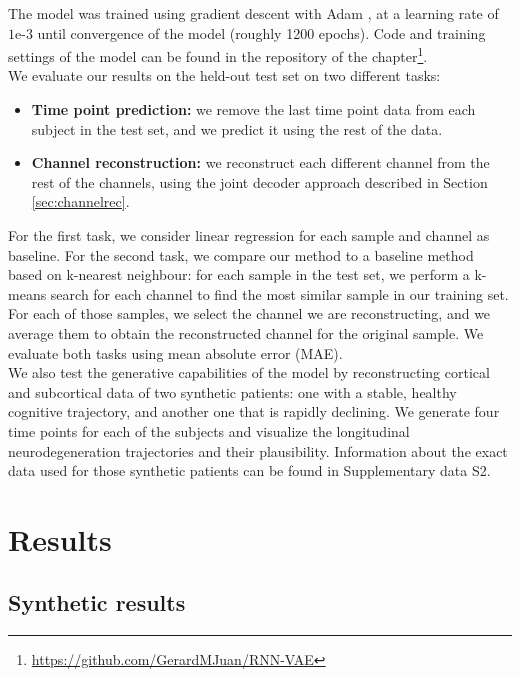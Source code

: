 The model was trained using gradient descent with Adam \cite{Kingma2015a}, at a learning rate of $1\text{e-}3$ until convergence of the model (roughly 1200 epochs). Code and training settings of the model can be found in the repository of the chapter\footnote{\url{https://github.com/GerardMJuan/RNN-VAE}}. \\

We evaluate our results on the held-out test set on two different tasks: 

\begin{itemize}
    \item \textbf{Time point prediction:} we remove the last time point data from each subject in the test set, and we predict it using the rest of the data. 
    \item \textbf{Channel reconstruction:} we reconstruct each different channel from the rest of the channels, using the joint decoder approach described in Section \ref{sec:channelrec}.
\end{itemize}

For the first task, we consider linear regression for each sample and channel as baseline. For the second task, we compare our method to a baseline method based on k-nearest neighbour: for each sample in the test set, we perform a k-means search for each channel to find the most similar sample in our training set. For each of those samples, we select the channel we are reconstructing, and we average them to obtain the reconstructed channel for the original sample. We evaluate both tasks using mean absolute error (MAE). \\

We also test the generative capabilities of the model by reconstructing cortical and subcortical data of two synthetic patients: one with a stable, healthy cognitive trajectory, and another one that is rapidly declining. We generate four time points for each of the subjects and visualize the longitudinal neurodegeneration trajectories and their plausibility. Information about the exact data used for those synthetic patients can be found in Supplementary data S2. \\

\section{Results}
\label{rnn:results}

\subsection{Synthetic results}

